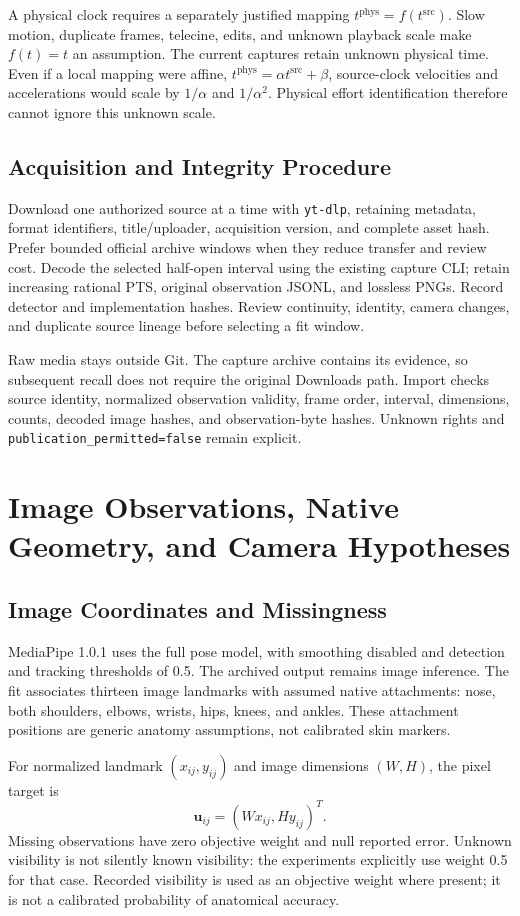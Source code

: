 \documentclass[11pt,letterpaper]{article}
\newcommand{\code}[1]{\nolinkurl{#1}}
\newcommand{\reportsection}[1]{\section{#1}}
\begin{document}
A physical clock requires a separately justified mapping
$t^{\mathrm{phys}}=f(t^{\mathrm{src}})$. Slow motion, duplicate frames,
telecine, edits, and unknown playback scale make $f(t)=t$ an assumption.
The current captures retain unknown physical time. Even if a local mapping were
affine, $t^{\mathrm{phys}}=\alpha t^{\mathrm{src}}+\beta$, source-clock
velocities and accelerations would scale by $1/\alpha$ and $1/\alpha^2$.
Physical effort identification therefore cannot ignore this unknown scale.

\subsection{Acquisition and Integrity Procedure}
Download one authorized source at a time with \code{yt-dlp}, retaining metadata,
format identifiers, title/uploader, acquisition version, and complete asset hash.
Prefer bounded official archive windows when they reduce transfer and review
cost. Decode the selected half-open interval using the existing capture CLI;
retain increasing rational PTS, original observation JSONL, and lossless PNGs.
Record detector and implementation hashes. Review continuity, identity, camera
changes, and duplicate source lineage before selecting a fit window.

Raw media stays outside Git. The capture archive contains its evidence, so
subsequent recall does not require the original Downloads path. Import checks
source identity, normalized observation validity, frame order, interval,
dimensions, counts, decoded image hashes, and observation-byte hashes.
Unknown rights and \code{publication_permitted=false} remain explicit.

\reportsection{Image Observations, Native Geometry, and Camera Hypotheses}
\subsection{Image Coordinates and Missingness}
MediaPipe 1.0.1 uses the full pose model, with smoothing disabled and detection
and tracking thresholds of 0.5. The archived output remains image inference.
The fit associates thirteen image landmarks with assumed native attachments:
nose, both shoulders, elbows, wrists, hips, knees, and ankles. These attachment
positions are generic anatomy assumptions, not calibrated skin markers.

For normalized landmark $(x_{ij},y_{ij})$ and image dimensions $(W,H)$, the
pixel target is
\[\mathbf u_{ij}=(W x_{ij},H y_{ij})^T.\]
Missing observations
have zero objective weight and null reported error. Unknown visibility is not
silently known visibility: the experiments explicitly use weight 0.5 for that
case. Recorded visibility is used as an objective weight where present; it is
not a calibrated probability of anatomical accuracy.
\end{document}
